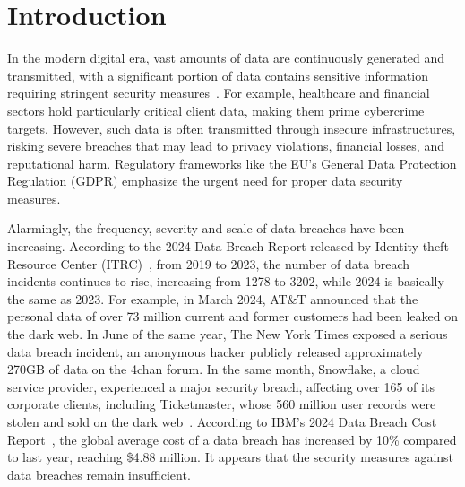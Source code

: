
\section{Introduction}

In the modern digital era, vast amounts of data are continuously generated and transmitted, with a significant portion of data contains sensitive information requiring stringent security measures~\cite{dataday}. For example, healthcare and financial sectors hold particularly critical client data, making them prime cybercrime targets. However, such data is often transmitted through insecure infrastructures, risking severe breaches that may lead to privacy violations, financial losses, and reputational harm. Regulatory frameworks like the EU's General Data Protection Regulation (GDPR) emphasize the urgent need for proper data security measures.

Alarmingly, the frequency, severity and scale of data breaches have been increasing. According to the 2024 Data Breach Report released by Identity theft Resource Center (ITRC)~\cite{ITRC2024}, from 2019 to 2023, the number of data breach incidents continues to rise, increasing from 1278 to 3202, while 2024 is basically the same as 2023. 
For example, in March 2024, AT\&T announced that the personal data of over 73 million current and former customers had been leaked on the dark web. In June of the same year, The New York Times exposed a serious data breach incident, an anonymous hacker publicly released approximately 270GB of data on the 4chan forum. In the same month, Snowflake, a cloud service provider, experienced a major security breach, affecting over 165 of its corporate clients, including Ticketmaster, whose 560 million user records were stolen and sold on the dark web~\cite{chaitin2024}.
According to IBM's 2024 Data Breach Cost Report~\cite{ibm2024databreach}, the global average cost of a data breach has increased by 10\% compared to last year, reaching \$4.88 million.  It appears that the security measures against data breaches remain insufficient.

